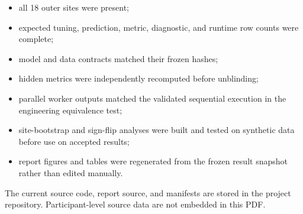 \documentclass[11pt,a4paper]{article}
\begin{document}
\begin{itemize}
  \item all 18 outer sites were present;
  \item expected tuning, prediction, metric, diagnostic, and runtime row counts
  were complete;
  \item model and data contracts matched their frozen hashes;
  \item hidden metrics were independently recomputed before unblinding;
  \item parallel worker outputs matched the validated sequential execution in
  the engineering equivalence test;
  \item site-bootstrap and sign-flip analyses were built and tested on
  synthetic data before use on accepted results;
  \item report figures and tables were regenerated from the frozen result
  snapshot rather than edited manually.
\end{itemize}

The current source code, report source, and manifests are stored in
the project repository. Participant-level source data are not embedded in this
PDF.

\clearpage
\begin{singlespace}


\end{singlespace}
\end{document}
